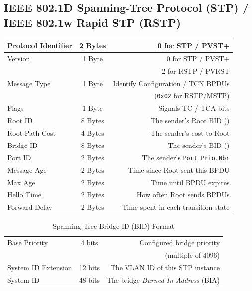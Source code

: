\documentclass[12pt]{article}
\begin{document}
	\subsection[IEEE 802.1D STP / IEEE 802.1w RSTP]{IEEE 802.1D Spanning-Tree Protocol (STP) /\\IEEE 802.1w Rapid STP (RSTP) \label{subsec:802.1D/w}}
	\begin{table}[H]
	\centering
	\begin{tabular}{| l | c | r |}\hline
	Protocol Identifier		& 2 Bytes	& 0 for STP / PVST+\\\hline
	Version			& 1 Byte	& 0 for STP / PVST+\\
					&		& 2 for RSTP / PVRST\\\hline
	Message Type		& 1 Byte	& Identify Configuration / TCN BPDUs\\
					&		& (\texttt{0x02} for RSTP/MSTP)\\\hline
	Flags				& 1 Byte	& Signals TC / TCA bits\\\hline
	Root ID			& 8 Bytes	& The sender's Root BID (\Cref{tab:BID})\\\hline
	Root Path Cost		& 4 Bytes	& The sender's cost to Root\\\hline
	Bridge ID			& 8 Bytes	& The sender's BID (\Cref{tab:BID})\\\hline
	Port ID			& 2 Bytes	& The sender's \texttt{Port Prio.Nbr}\\\hline
	Message Age		& 2 Bytes	& Time since Root sent this BPDU\\\hline
	Max Age			& 2 Bytes	& Time until BPDU expires\\\hline
	Hello Time			& 2 Bytes	& How often Root sends BPDUs\\\hline
	Forward Delay		& 2 Bytes	& Time spent in each transition state\\\hline
	\end{tabular}\end{table}

	\begin{table}[H]
	\centering
	\caption{Spanning Tree Bridge ID (BID) Format \label{tab:BID}}
	\begin{tabular}{| l | c | r |}\hline
	Base Priority		& 4 bits	& Configured bridge priority\\
					&		& (multiple of 4096)\\\hline
	System ID Extension	& 12 bits	& The VLAN ID of this STP instance\\\hline
	System ID			& 48 bits	& The bridge \textit{Burned-In Address} (BIA)\\\hline
	\end{tabular}\end{table}
\end{document}
